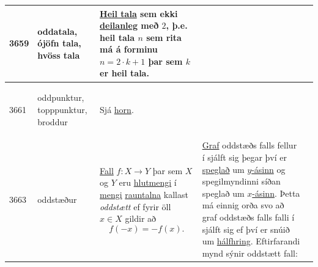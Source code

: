 \begin{longtable}{p{} | p{} | p{} | p{} | p{}}
\hline
3659 & \hypertarget{row:3659}{oddatala, ójöfn tala, hvöss tala} & \hyperlink{row:1896}{Heil tala} sem ekki \hyperlink{row:648}{deilanleg} með \(2\), þ.e. heil tala \(n\) sem rita má á forminu \(n = 2 \cdot k + 1\) þar sem \(k\) er heil tala. &  &  \\
\hline
3661 & \hypertarget{row:3661}{oddpunktur, topppunktur, broddur} & Sjá \hyperlink{row:2198}{horn}. &  &  \\
\hline
3663 & \hypertarget{row:3663}{oddstæður} & \hyperlink{row:1078}{Fall} \(f: X \to Y\) þar sem \(X\) og \(Y\) eru \hyperlink{row:2098}{hlutmengi} í \hyperlink{row:3270}{mengi} \hyperlink{row:4093}{rauntalna} kallast \textit{oddstætt} ef fyrir öll \(x \in X\) gildir að \[ f(-x) = - f(x). \] & \hyperlink{row:2955}{Graf} oddstæðs falls fellur í sjálft sig þegar því er \hyperlink{row:4986}{speglað} um \hyperlink{row:6253}{\(y\)-ásinn} og spegilmyndinni síðan speglað um \hyperlink{row:6252}{\(x\)-ásinn}. Þetta má einnig orða svo að graf oddstæðs falls falli í sjálft sig ef því er snúið um \hyperlink{row:1838}{hálfhring}. Eftirfarandi mynd sýnir oddstætt fall:


\end{longtable}
